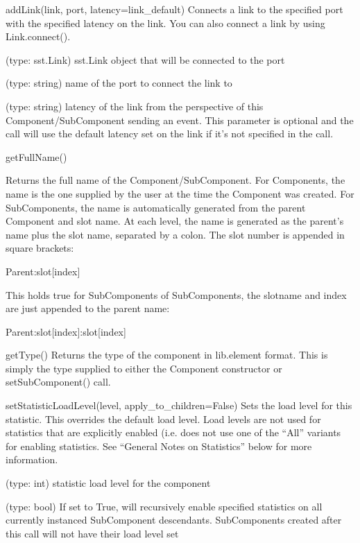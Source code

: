 \begin{functiondoc}{addLink(link, port, latency=link_default)}
  { Connects a link to the specified port with the specified latency
    on the link.  You can also connect a link by using Link.connect().}

   (type: sst.Link) sst.Link object that will be connected
  to the port

   (type: string) name of the port to connect the link to

   (type: string) latency of the link from the
  perspective of this Component/SubComponent sending an event.  This
  parameter is optional and the call will use the default latency set
  on the link if it’s not specified in the call.

\noreturn
\end{functiondoc}

\begin{functiondoc}{getFullName()}
  { Returns the full name of the Component/SubComponent.  For
    Components, the name is the one supplied by the user at the time
    the Component was created.  For SubComponents, the name is
    automatically generated from the parent Component and slot name.
    At each level, the name is generated as the parent's name plus the
    slot name, separated by a colon.  The slot number is appended in
    square brackets:

    Parent:slot[index]

    This holds true for SubComponents of SubComponents, the slotname
    and index are just appended to the parent name:

    Parent:slot[index]:slot[index]
  }
\end{functiondoc}


\begin{functiondoc}{getType()}
  { Returns the type of the component in lib.element format.  This is
    simply the type supplied to either the Component constructor or
    setSubComponent() call. }

\end{functiondoc}


\begin{functiondoc}{setStatisticLoadLevel(level, apply_to_children=False)}
  { Sets the load level for this statistic.  This overrides the
    default load level.  Load levels are not used for statistics that
    are explicitly enabled (i.e. does not use one of the “All”
    variants for enabling statistics.  See “General Notes on
    Statistics” below for more information.}

   (type: int) statistic load level for the component

   (type: bool) If set to True, will
  recursively enable specified statistics on all currently instanced
  SubComponent descendants.  SubComponents created after this call
  will not have their load level set

  \noreturn
\end{functiondoc}


